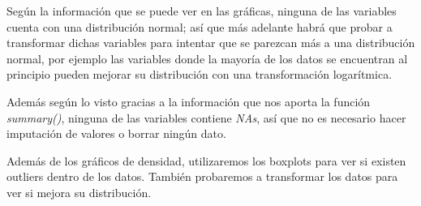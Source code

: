 \documentclass[11pt]{article}
\begin{document}
    Según la información que se puede ver en las gráficas, ninguna de las
variables cuenta con una distribución normal; así que más adelante habrá
que probar a transformar dichas variables para intentar que se parezcan
más a una distribución normal, por ejemplo las variables donde la
mayoría de los datos se encuentran al principio pueden mejorar su
distribución con una transformación logarítmica.

Además según lo visto gracias a la información que nos aporta la función
\emph{summary()}, ninguna de las variables contiene \emph{NAs}, así que
no es necesario hacer imputación de valores o borrar ningún dato.

Además de los gráficos de densidad, utilizaremos los boxplots para ver
si existen outliers dentro de los datos. También probaremos a
transformar los datos para ver si mejora su distribución.
\end{document}

